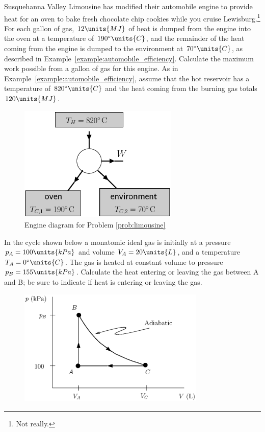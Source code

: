 \begin{problem} 
  Susquehanna Valley Limousine has modified their automobile engine to
  provide heat for an oven to bake fresh chocolate chip cookies while
  you cruise Lewisburg.\footnote{Not really.}  For each gallon of gas,
  $12\units{MJ}$ of heat is dumped from the engine into the oven at a 
  temperature of $190^\circ\units{C}$, and the remainder of the heat 
  coming from the engine is dumped to the environment at 
  $70^\circ\units{C}$, as described in 
  Example~\ref{example:automobile_efficiency}.  Calculate the maximum
  work possible from a gallon of gas for this engine.  As in 
  Example~\ref{example:automobile_efficiency}, assume that the hot
  reservoir has a temperature of $820^{\circ}\units{C}$ and the 
  heat coming from the burning gas totals $120\units{MJ}$.
  \begin{figure}[h]
   \begin{center}
   \includegraphics[width=3.0in]{heat_engines/limousine.eps} 
   \end{center} 
   \caption{Engine diagram for Problem \ref{prob:limousine}}
   \end{figure}
\label{prob:limousine} 
\end{problem}
\newpage

\begin{problem}  %
  In the cycle shown below a monatomic ideal gas is initially 
  at a pressure $p_A=100\units{kPa}$ and volume $V_A = 20\units{L}$,
  and a temperature $T_A=0^\circ\units{C}$.  
  The gas is heated at constant volume to pressure $p_B = 155\units{kPa}$. 
  Calculate the heat entering or leaving the gas between A and B; be 
  sure to indicate if heat is entering or leaving the gas.
  \begin{figure}[h]
    \begin{center}
      \includegraphics[width=3.5in]{heat_engines/cycle.eps}
    \end{center}
  \end{figure}
\label{prob:threelegcycle}
\end{problem}

